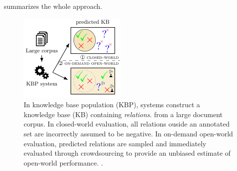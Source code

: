  summarizes the whole approach. 

\begin{figure}[t]
  \includegraphics[width=\columnwidth]{figures/overview}
  \caption{\label{fig:overview}
  In knowledge base population (KBP), systems construct a knowledge base (KB) containing \textit{relations}. %
  from a large document corpus.
  In closed-world evaluation, %
  all relations ouside an annotated set are incorrectly assumed to be negative.
  In on-demand open-world evaluation,
  predicted relations are sampled and immediately evaluated through crowdsourcing
  to provide an unbiased estimate of open-world performance. %
  .
  }
\end{figure}

